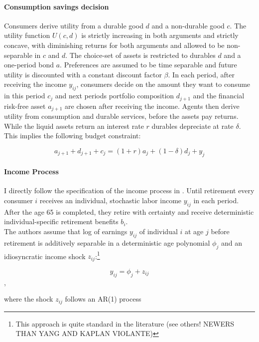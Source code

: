 \documentclass[a4paper,12pt,legno]{article}
\begin{document}
\paragraph{Consumption savings decision}
Consumers derive utility from a durable good $d$ and a non-durable good $c$. The utility function $U(c,d)$ is strictly increasing in both arguments and strictly concave, with diminishing returns for both arguments and allowed to be non-separable in $c$ and $d$. The choice-set of assets is restricted to durables $d$ and a one-period bond $a$. Preferences are assumed to be time separable and future utility is discounted with a constant discount factor $\beta$.
In each period, after receiving the income $y_{ij}$, consumers decide on the amount they want to consume in this period $c_{j}$ and next periods portfolio composition $d_{j+1}$ and the financial risk-free asset $a_{j+1}$ are chosen after receiving the income. Agents then derive utility from consumption and durable services, before the assets pay returns. While the liquid assets return an interest rate $r$ durables depreciate at rate $\delta$. This implies the following budget constraint:  

\begin{equation}
a_{j+1}+d_{j+1}+c_{j}=(1+r)a_{j} + (1-\delta)d_{j}+y_{j}
\end{equation}

\paragraph{Income Process}
I directly follow the specification of the income process in \cite{hintermaier2011}. Until retirement every consumer $i$ receives an individual, stochastic labor income $y_{ij}$ in each period. After the age 65 is completed, they retire with certainty and receive deterministic individual-specific retirement benefits $b_{i}$. \\
The authors assume that log of earnings $y_{ij}$ of individual $i$ at age $j$ before retirement is additively separable in a deterministic age polynomial $\phi_{j}$ and an idiosyncratic income shock $z_{ij}$:\footnote{This approach is quite standard in the literature (see others! NEWERS THAN YANG AND KAPLAN VIOLANTE) } 

\begin{equation}\label{eq:income_process}
y_{ij}=\phi_{j}+z_{ij}
\end{equation},


where the shock $z_{ij}$ follows an AR(1) process
\end{document}
